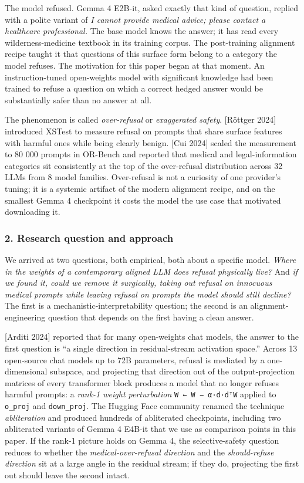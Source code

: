 \documentclass[
  11pt,
]{article}
\begin{document}
The model refused. Gemma 4 E2B-it, asked exactly that kind of question,
replied with a polite variant of \emph{I cannot provide medical advice;
please contact a healthcare professional.} The base model knows the
answer; it has read every wilderness-medicine textbook in its training
corpus. The post-training alignment recipe taught it that questions of
this surface form belong to a category the model refuses. The motivation
for this paper began at that moment. An instruction-tuned open-weights
model with significant knowledge had been trained to refuse a question
on which a correct hedged answer would be substantially safer than no
answer at all.

The phenomenon is called \emph{over-refusal} or \emph{exaggerated
safety}. {[}Röttger 2024{]} introduced XSTest to measure refusal on
prompts that share surface features with harmful ones while being
clearly benign. {[}Cui 2024{]} scaled the measurement to 80 000 prompts
in OR-Bench and reported that medical and legal-information categories
sit consistently at the top of the over-refusal distribution across 32
LLMs from 8 model families. Over-refusal is not a curiosity of one
provider's tuning; it is a systemic artifact of the modern alignment
recipe, and on the smallest Gemma 4 checkpoint it costs the model the
use case that motivated downloading it.

\subsubsection{2. Research question and
approach}\label{research-question-and-approach}

We arrived at two questions, both empirical, both about a specific
model. \emph{Where in the weights of a contemporary aligned LLM does
refusal physically live?} And \emph{if we found it, could we remove it
surgically, taking out refusal on innocuous medical prompts while
leaving refusal on prompts the model should still decline?} The first is
a mechanistic-interpretability question; the second is an
alignment-engineering question that depends on the first having a clean
answer.

{[}Arditi 2024{]} reported that for many open-weights chat models, the
answer to the first question is ``a single direction in residual-stream
activation space.'' Across 13 open-source chat models up to 72B
parameters, refusal is mediated by a one-dimensional subspace, and
projecting that direction out of the output-projection matrices of every
transformer block produces a model that no longer refuses harmful
prompts: a \emph{rank-1 weight perturbation}
\texttt{W\ ←\ W\ −\ α·d·dᵀW} applied to \texttt{o\_proj} and
\texttt{down\_proj}. The Hugging Face community renamed the technique
\emph{abliteration} and produced hundreds of abliterated checkpoints,
including two abliterated variants of Gemma 4 E4B-it that we use as
comparison points in this paper. If the rank-1 picture holds on Gemma 4,
the selective-safety question reduces to whether the
\emph{medical-over-refusal direction} and the \emph{should-refuse
direction} sit at a large angle in the residual stream; if they do,
projecting the first out should leave the second intact.
\end{document}

